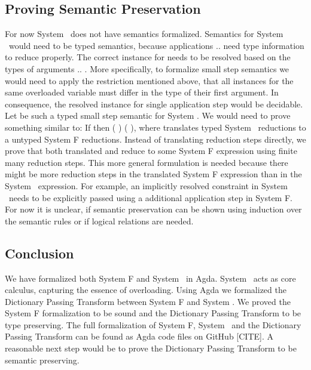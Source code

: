 \subsection{Proving Semantic Preservation }
For now System \Fo\ does not have semantics formalized.
Semantics for System \Fo\ would need to be typed semantics, because applications     $..$   need type information to reduce properly.
The correct instance for  needs to be resolved based on the types of arguments  $..$ . 
More specifically, to formalize small step semantics we would need to apply the restriction mentioned above, that all instances for the same overloaded variable  must differ in the type of their first argument. 
In consequence, the resolved instance for single application step     would be decidable.
Let    be such a typed small step semantic for System \Fo. We would need to prove something similar to: If    then  \Constr{[}  \Constr{]} (   )  (   ), where  translates typed System \Fo\ reductions to a untyped System F reductions.
Instead of translating reduction steps directly, we prove that both translated  and  reduce to some System F expression  using finite many reduction steps.
This more general formulation is needed because there might be more reduction steps in the translated System F expression than in the System \Fo\ expression. 
For example, an implicitly resolved constraint in System \Fo\ needs to be explicitly passed using a additional application step in System F. 
For now it is unclear, if semantic preservation can be shown using induction over the semantic rules or if logical relations are needed.

\subsection{Conclusion}
We have formalized both System F and System \Fo\ in Agda. 
System \Fo\ acts as core calculus, capturing the essence of overloading.
Using Agda we formalized the Dictionary Passing Transform between System F and System \Fo. 
We proved the System F formalization to be sound and the Dictionary Passing Transform to be type preserving. The full formalization of System F, System \Fo\ and the Dictionary Passing Transform can be found as Agda code files on GitHub [CITE].
A reasonable next step would be to prove the Dictionary Passing Transform to be semantic preserving. 